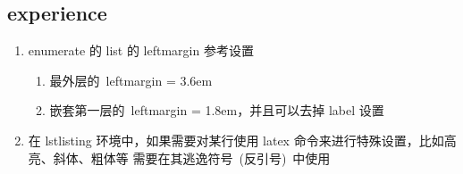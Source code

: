 
\subsection{experience}

\begin{enumerate}[topsep=0pt,itemsep=0pt,parsep=0pt,leftmargin=3.6em,label=\arabic*>]
    \item enumerate 的 list 的 leftmargin 参考设置
    \begin{enumerate}[topsep=0pt,itemsep=0pt,parsep=0pt,leftmargin=1.8em]
        \item 最外层的\ {\color{DefinedColorRed}leftmargin = 3.6em}
        \item 嵌套第一层的\ {\color{DefinedColorRed}leftmargin = 1.8em}，并且可以去掉 label 设置
    \end{enumerate}
    \item 在 lstlisting 环境中，如果需要对某行使用 latex 命令来进行特殊设置，比如高亮、斜体、粗体等
        需要在其逃逸符号\ {\color{DefinedColorRed}(反引号)}\ 中使用
\end{enumerate}




